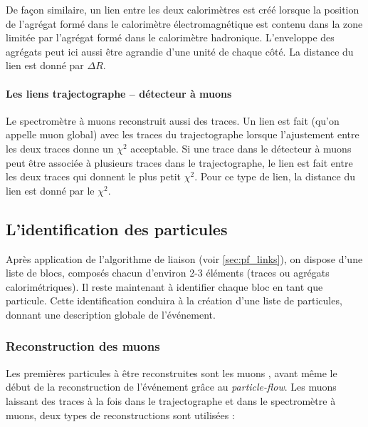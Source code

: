 De façon similaire, un lien entre les deux calorimètres est créé lorsque la position de l'agrégat formé dans le calorimètre électromagnétique est contenu dans la zone limitée par l'agrégat formé dans le calorimètre hadronique. L'enveloppe des agrégats peut ici aussi être agrandie d'une unité de chaque côté. La distance du lien est donné par $\Delta R$. %

\paragraph{Les liens trajectographe – détecteur à muons} \label{sec:pf_link_mu}

Le spectromètre à muons reconstruit aussi des traces. Un lien est fait (qu'on appelle muon global) avec les traces du trajectographe lorsque l'ajustement entre les deux traces donne un $\chi^2$ acceptable. Si une trace dans le détecteur à muons peut être associée à plusieurs traces dans le trajectographe, le lien est fait entre les deux traces qui donnent le plus petit $\chi^2$. Pour ce type de lien, la distance du lien est donné par le $\chi^2$.

\subsection{L'identification des particules}

Après application de l'algorithme de liaison (voir \cref{sec:pf_links}), on dispose d'une liste de blocs, composés chacun d'environ 2-3 éléments (traces ou agrégats calorimétriques). Il reste maintenant à identifier chaque bloc en tant que particule. Cette identification conduira à la création d'une liste de particules, donnant une description globale de l'événement.

\subsubsection{Reconstruction des muons}

Les premières particules à être reconstruites sont les muons \citep{cms_muons_reco}, avant même le début de la reconstruction de l'événement grâce au \emph{particle-flow}. Les muons laissant des traces à la fois dans le trajectographe et dans le spectromètre à muons, deux types de reconstructions sont utilisées :

